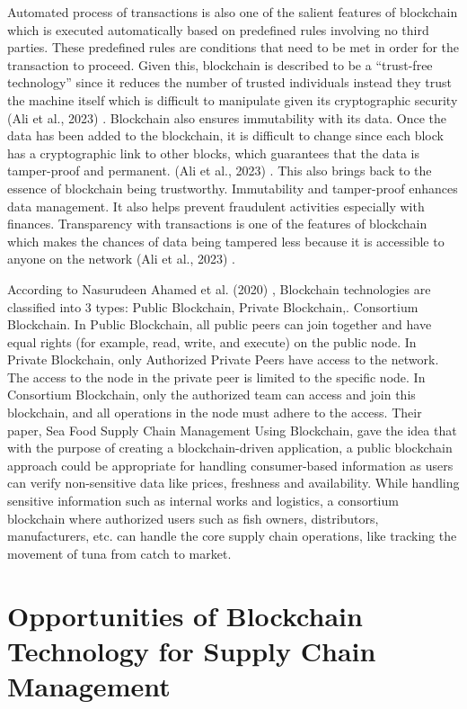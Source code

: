 Automated process of transactions is also one of the salient features of blockchain which is executed automatically based on predefined rules involving no third parties. These predefined rules are conditions that need to be met in order for the transaction to proceed. Given this, blockchain is described to be a “trust-free technology” since it reduces the number of trusted individuals instead they trust the machine itself which is difficult to manipulate given its cryptographic security (Ali et al., 2023) \nocite{rrl-ToB3}. Blockchain also ensures immutability with its data. Once the data has been added to the blockchain, it is difficult to change since each block has a cryptographic link to other blocks, which guarantees that the data is tamper-proof and permanent. (Ali et al., 2023) \nocite{rrl-ToB3}. This also brings back to the essence of blockchain being trustworthy. Immutability and tamper-proof enhances data management. It also helps prevent fraudulent activities especially with finances. Transparency with transactions is one of the features of blockchain which makes the chances of data being tampered less because it is accessible to anyone on the network (Ali et al., 2023) \nocite{rrl-ToB3}.

According to Nasurudeen Ahamed et al. (2020) \nocite{rrl-ToB4}, Blockchain technologies are classified into 3 types: Public Blockchain, Private Blockchain,. Consortium Blockchain. In Public Blockchain, all public peers can join together and have equal rights (for example, read, write, and execute) on the public node. In Private Blockchain, only Authorized Private Peers have access to the network. The access to the node in the private peer is limited to the specific node. In Consortium Blockchain, only the authorized team can access and join this blockchain, and all operations in the node must adhere to the access. Their paper, Sea Food Supply Chain Management Using Blockchain, gave the idea that with the purpose of creating a blockchain-driven application, a public blockchain approach could be appropriate for handling consumer-based information as users can verify non-sensitive data like prices, freshness and availability. While handling sensitive information such as internal works and logistics, a consortium blockchain where authorized users such as fish owners, distributors, manufacturers, etc. can handle the core supply chain operations, like tracking the movement of tuna from catch to market.


\section{Opportunities of Blockchain Technology for Supply Chain Management}

